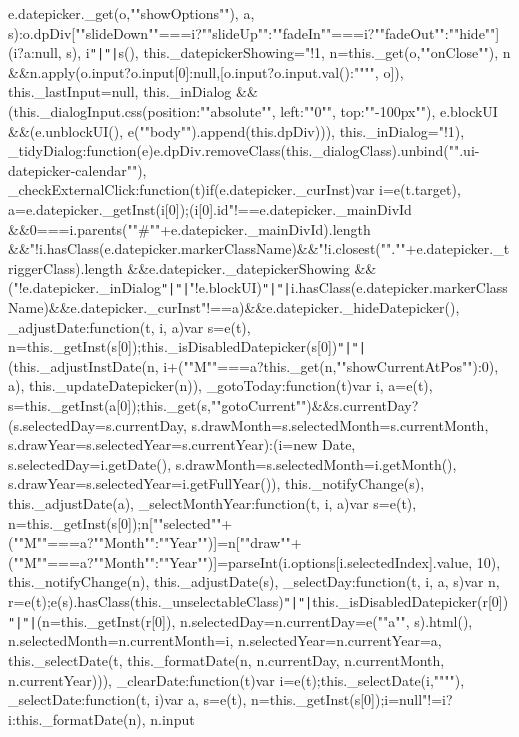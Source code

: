 e.\+datepicker.\+\_\+get(o,""show\+Options""), a, s)\+:o.\+dp\+Div[""slide\+Down""===i?""slide\+Up""\+:""fade\+In""===i?""fade\+Out""\+:""hide""](i?a\+:null, s), i\texttt{"|}\texttt{"|}s(), this.\+\_\+datepicker\+Showing="!1, n=this.\+\_\+get(o,""on\+Close""), n \&\&n.\+apply(o.\+input?o.\+input[0]\+:null,[o.\+input?o.\+input.\+val()\+:"""", o]), this.\+\_\+last\+Input=null, this.\+\_\+in\+Dialog \&\&(this.\+\_\+dialog\+Input.\+css(\lcurly{}position\+:""absolute"", left\+:""0"", top\+:""-\/100px""\rcurly{}), e.\+block\+U\+I \&\&(e.\+unblock\+U\+I(), e(""body"").\+append(this.\+dp\+Div))), this.\+\_\+in\+Dialog="!1)\rcurly{}, \+\_\+tidy\+Dialog\+:function(e)\lcurly{}e.\+dp\+Div.\+remove\+Class(this.\+\_\+dialog\+Class).\+unbind("".\+ui-\/datepicker-\/calendar"")\rcurly{}, \+\_\+check\+External\+Click\+:function(t)\lcurly{}if(e.\+datepicker.\+\_\+cur\+Inst)\lcurly{}var i=e(t.\+target), a=e.\+datepicker.\+\_\+get\+Inst(i[0]);(i[0].\+id"!==e.\+datepicker.\+\_\+main\+Div\+Id \&\&0===i.\+parents(""\#""+e.\+datepicker.\+\_\+main\+Div\+Id).\+length \&\&"!i.\+has\+Class(e.\+datepicker.\+marker\+Class\+Name)\&\&"!i.\+closest("".""+e.\+datepicker.\+\_\+trigger\+Class).\+length \&\&e.\+datepicker.\+\_\+datepicker\+Showing \&\&("!e.\+datepicker.\+\_\+in\+Dialog\texttt{"|}\texttt{"|}"!e.\+block\+U\+I)\texttt{"|}\texttt{"|}i.\+has\+Class(e.\+datepicker.\+marker\+Class\+Name)\&\&e.\+datepicker.\+\_\+cur\+Inst"!==a)\&\&e.\+datepicker.\+\_\+hide\+Datepicker()\rcurly{}\rcurly{}, \+\_\+adjust\+Date\+:function(t, i, a)\lcurly{}var s=e(t), n=this.\+\_\+get\+Inst(s[0]);this.\+\_\+is\+Disabled\+Datepicker(s[0])\texttt{"|}\texttt{"|}(this.\+\_\+adjust\+Inst\+Date(n, i+(""M""===a?this.\+\_\+get(n,""show\+Current\+At\+Pos"")\+:0), a), this.\+\_\+update\+Datepicker(n))\rcurly{}, \+\_\+goto\+Today\+:function(t)\lcurly{}var i, a=e(t), s=this.\+\_\+get\+Inst(a[0]);this.\+\_\+get(s,""goto\+Current"")\&\&s.\+current\+Day?(s.\+selected\+Day=s.\+current\+Day, s.\+draw\+Month=s.\+selected\+Month=s.\+current\+Month, s.\+draw\+Year=s.\+selected\+Year=s.\+current\+Year)\+:(i=new Date, s.\+selected\+Day=i.\+get\+Date(), s.\+draw\+Month=s.\+selected\+Month=i.\+get\+Month(), s.\+draw\+Year=s.\+selected\+Year=i.\+get\+Full\+Year()), this.\+\_\+notify\+Change(s), this.\+\_\+adjust\+Date(a)\rcurly{}, \+\_\+select\+Month\+Year\+:function(t, i, a)\lcurly{}var s=e(t), n=this.\+\_\+get\+Inst(s[0]);n[""selected""+(""M""===a?""Month""\+:""Year"")]=n[""draw""+(""M""===a?""Month""\+:""Year"")]=parse\+Int(i.\+options[i.\+selected\+Index].\+value, 10), this.\+\_\+notify\+Change(n), this.\+\_\+adjust\+Date(s)\rcurly{}, \+\_\+select\+Day\+:function(t, i, a, s)\lcurly{}var n, r=e(t);e(s).\+has\+Class(this.\+\_\+unselectable\+Class)\texttt{"|}\texttt{"|}this.\+\_\+is\+Disabled\+Datepicker(r[0])\texttt{"|}\texttt{"|}(n=this.\+\_\+get\+Inst(r[0]), n.\+selected\+Day=n.\+current\+Day=e(""a"", s).\+html(), n.\+selected\+Month=n.\+current\+Month=i, n.\+selected\+Year=n.\+current\+Year=a, this.\+\_\+select\+Date(t, this.\+\_\+format\+Date(n, n.\+current\+Day, n.\+current\+Month, n.\+current\+Year)))\rcurly{}, \+\_\+clear\+Date\+:function(t)\lcurly{}var i=e(t);this.\+\_\+select\+Date(i,"""")\rcurly{}, \+\_\+select\+Date\+:function(t, i)\lcurly{}var a, s=e(t), n=this.\+\_\+get\+Inst(s[0]);i=null"!=i?i\+:this.\+\_\+format\+Date(n), n.\+input 